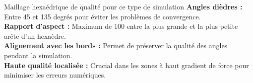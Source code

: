 \begin{frame}{Maillage hexaédrique de qualité pour ce type de simulation}
    \small{
        \textbf{Angles dièdres :} Entre 45 et 135 degrés pour éviter les problèmes de convergence.\\
    }
    \vspace{0.5cm}
    \small{
        \textbf{Rapport d'aspect :} Maximum de 100 entre la plus grande et la plus petite arête d'un hexaèdre.\\
    }
    \vspace{0.5cm}
    \small{
        \textbf{Alignement avec les bords :} Permet de préserver la qualité des angles pendant la simulation.\\
    }
    \vspace{0.5cm}
    \small{
        \textbf{Haute qualité localisée :} Crucial dans les zones à haut gradient de force pour minimiser les erreurs numériques.\\
    }
\end{frame}
